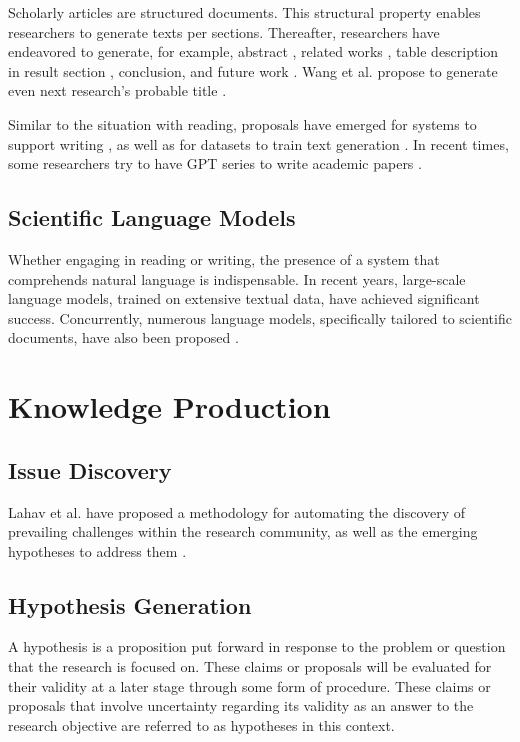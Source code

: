 \documentclass{book}
\begin{document}
Scholarly articles are structured documents. This structural property enables researchers to generate texts per sections. Thereafter, 
researchers have endeavored to generate, for example, abstract \cite{kumarasinghe2022automatic,gao2022comparing,wang2019paperrobot}, related works \cite{li2022automatic,shah2021generating}, table description in result section \cite{moosavi2021scigen,moosavi2021learning}, conclusion, and future work \cite{wang2019paperrobot}. Wang et al. propose to generate even next research's probable title \cite{wang2019paperrobot}.

Similar to the situation with reading, proposals have emerged for systems to support writing \cite{narimatsu2021task}, as well as for datasets to train text generation \cite{chen2021scixgen}. In recent times, some researchers try to have GPT series to write academic papers \cite{transformer2022can}. 

\subsection{Scientific Language Models}

Whether engaging in reading or writing, the presence of a system that comprehends natural language is indispensable. In recent years, large-scale language models, trained on extensive textual data, have achieved significant success. Concurrently, numerous language models, specifically tailored to scientific documents, have also been proposed \cite{beltagy2019scibert,singh2022scirepeval,nadkarni2021scientific,cohan2020specter,gupta2022matscibert,taylor2022galactica}.

\section{Knowledge Production}


\subsection{Issue Discovery}
Lahav et al. have proposed a methodology for automating the discovery of prevailing challenges within the research community, as well as the emerging hypotheses to address them \cite{lahav2022search}.

\subsection{Hypothesis Generation}
A hypothesis is a proposition put forward in response to the problem or question that the research is focused on. These claims or proposals will be evaluated for their validity at a later stage through some form of procedure. These claims or proposals that involve uncertainty regarding its validity as an answer to the research objective are referred to as hypotheses in this context.
\end{document}
